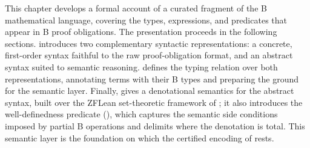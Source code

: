 \label{ch:b}

This chapter develops a formal account of a curated fragment of the B mathematical
language, covering the types, expressions, and predicates that appear in B proof
obligations.
The presentation proceeds in the following sections.
 introduces two complementary syntactic representations: a concrete,
first-order syntax faithful to the raw proof-obligation format, and an abstract
syntax suited to semantic reasoning.
 defines the typing relation over both representations, annotating
terms with their B types and preparing the ground for the semantic layer.
Finally,  gives a denotational semantics for the abstract syntax,
built over the ZFLean set-theoretic framework of ; it also introduces the
well-definedness predicate (), which captures the semantic side conditions
imposed by partial B operations and delimits where the denotation is total. This semantic layer
is the foundation on which the certified encoding of  rests.




